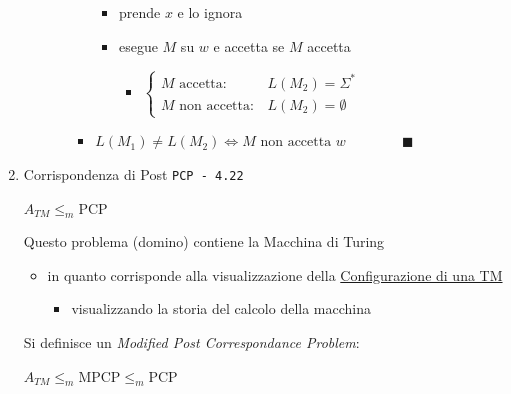 \documentclass[11pt]{article}
\begin{document}
\begin{enumerate}
\begin{enumerate}
\begin{itemize}
\begin{itemize}
\begin{itemize}
\item prende \(x\) e lo ignora
\item esegue \(M\) su \(w\) e accetta se \(M\) accetta
\begin{itemize}
\item \(\begin{cases} M \mbox{ accetta}: & L(M_{2})=\Sigma^{*}\\M \mbox{ non accetta}: & L(M_{2}) = \emptyset  \end{cases}\)
\end{itemize}
\end{itemize}
\item \(L(M_{1}) \neq L(M_{2}) \iff M \mbox{ non accetta }w \qquad\qquad \blacksquare\)
\end{itemize}
\end{itemize}
\end{enumerate}

\item Corrispondenza di Post
\label{sec:orgc38fb0a}
\texttt{PCP - 4.22}

\(A_{TM} \le_{m} \text{PCP}\)

Questo problema (domino) contiene la Macchina di Turing
\begin{itemize}
\item in quanto corrisponde alla visualizzazione della \hyperref[sec:org3e025da]{Configurazione di una TM}
\begin{itemize}
\item visualizzando la storia del calcolo della macchina
\end{itemize}
\end{itemize}

Si definisce un \emph{Modified Post Correspondance Problem}:

\(A_{TM} \le_{m} \text{MPCP} \le_{m} \text{PCP}\)


\end{enumerate}
\end{document}
